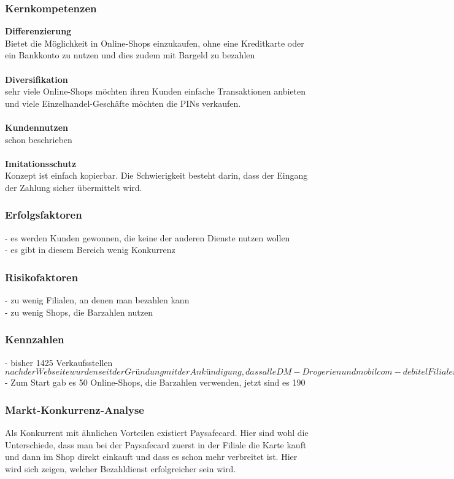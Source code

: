 \subsubsection{Kernkompetenzen}
\textbf{Differenzierung}\\
Bietet die Möglichkeit in Online-Shops einzukaufen, ohne eine Kreditkarte oder ein Bankkonto zu nutzen und dies zudem
mit Bargeld zu bezahlen\\
\\
\textbf{Diversifikation}\\
sehr viele Online-Shops möchten ihren Kunden einfache Transaktionen anbieten und viele Einzelhandel-Geschäfte möchten
die PINs verkaufen.\\
\\
\textbf{Kundennutzen}\\
schon beschrieben\\
\\
\textbf{Imitationsschutz}\\
Konzept ist einfach kopierbar. Die Schwierigkeit besteht darin, dass der Eingang der Zahlung sicher übermittelt wird.\\

\subsubsection{Erfolgsfaktoren}
- es werden Kunden gewonnen, die keine der anderen Dienste nutzen wollen\\
- es gibt in diesem Bereich wenig Konkurrenz\\

\subsubsection{Risikofaktoren}
- zu wenig Filialen, an denen man bezahlen kann\\
- zu wenig Shops, die Barzahlen nutzen\\

\subsubsection{Kennzahlen}
- bisher 1425 Verkaufsstellen \(nach der Webseite wurden seit der Gründung mit der Ankündigung, dass alle DM-Drogerien
und mobilcom-debitel Filialen in Berlin Barzahlen unterstützen werden, keine zusätzlichen gefunden\) \\
- Zum Start gab es 50 Online-Shops, die Barzahlen verwenden, jetzt sind es 190\\

\subsubsection{Markt-Konkurrenz-Analyse}
Als Konkurrent mit ähnlichen Vorteilen existiert Paysafecard. Hier sind wohl die Unterschiede, dass man bei der
Paysafecard zuerst in der Filiale die Karte kauft und dann im Shop direkt einkauft und dass es schon mehr verbreitet ist.
Hier wird sich zeigen, welcher Bezahldienst erfolgreicher sein wird.
